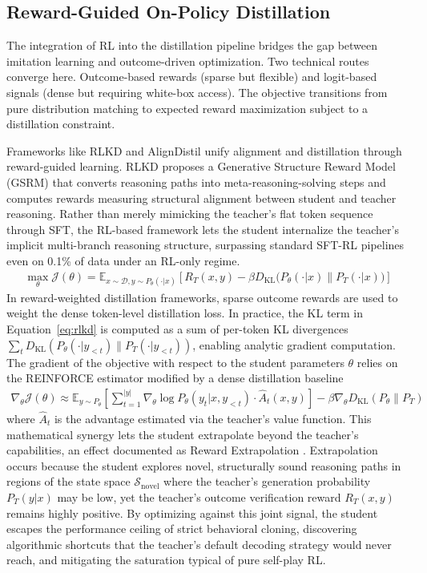 \documentclass{article} %
\newcommand{\KL}{D_{\mathrm{KL}}}
\begin{document}
\subsection{Reward-Guided On-Policy Distillation}
\label{sec:reward_guided_opd}
The integration of RL into the distillation pipeline bridges the gap between imitation learning and outcome-driven optimization. Two technical routes converge here. Outcome-based rewards (sparse but flexible) and logit-based signals (dense but requiring white-box access). The objective transitions from pure distribution matching to expected reward maximization subject to a distillation constraint.


Frameworks like RLKD \citep{2505.16142} and AlignDistil \citep{2503.02832} unify alignment and distillation through reward-guided learning. RLKD proposes a Generative Structure Reward Model (GSRM) that converts reasoning paths into meta-reasoning-solving steps and computes rewards measuring structural alignment between student and teacher reasoning. Rather than merely mimicking the teacher's flat token sequence through SFT, the RL-based framework lets the student internalize the teacher's implicit multi-branch reasoning structure, surpassing standard SFT-RL pipelines even on 0.1\% of data under an RL-only regime.
\begin{align}
\max_{\theta} \mathcal{J}(\theta) = \mathbb{E}_{x \sim \mathcal{D}, y \sim P_\theta(\cdot|x)} \left[ R_T(x, y) - \beta \KL\big(P_\theta(\cdot|x) \parallel P_T(\cdot|x)\big) \right] \label{eq:rlkd}
\end{align}
In reward-weighted distillation frameworks, sparse outcome rewards are used to weight the dense token-level distillation loss. In practice, the KL term in Equation~\ref{eq:rlkd} is computed as a sum of per-token KL divergences $\sum_t \KL(P_\theta(\cdot|y_{<t}) \parallel P_T(\cdot|y_{<t}))$, enabling analytic gradient computation. The gradient of the objective with respect to the student parameters $\theta$ relies on the REINFORCE estimator modified by a dense distillation baseline
\begin{align}
\nabla_\theta \mathcal{J}(\theta) \approx \mathbb{E}_{y \sim P_\theta} \left[ \sum_{t=1}^{|y|} \nabla_\theta \log P_\theta(y_t | x, y_{<t}) \cdot \hat{A}_t(x, y) \right] - \beta \nabla_\theta \KL(P_\theta \parallel P_T)
\end{align}
where $\hat{A}_t$ is the advantage estimated via the teacher's value function. This mathematical synergy lets the student extrapolate beyond the teacher's capabilities, an effect documented as Reward Extrapolation \citep{2602.12125}. Extrapolation occurs because the student explores novel, structurally sound reasoning paths in regions of the state space $\mathcal{S}_{\text{novel}}$ where the teacher's generation probability $P_T(y|x)$ may be low, yet the teacher's outcome verification reward $R_T(x, y)$ remains highly positive. By optimizing against this joint signal, the student escapes the performance ceiling of strict behavioral cloning, discovering algorithmic shortcuts that the teacher's default decoding strategy would never reach, and mitigating the saturation typical of pure self-play RL.
\end{document}
